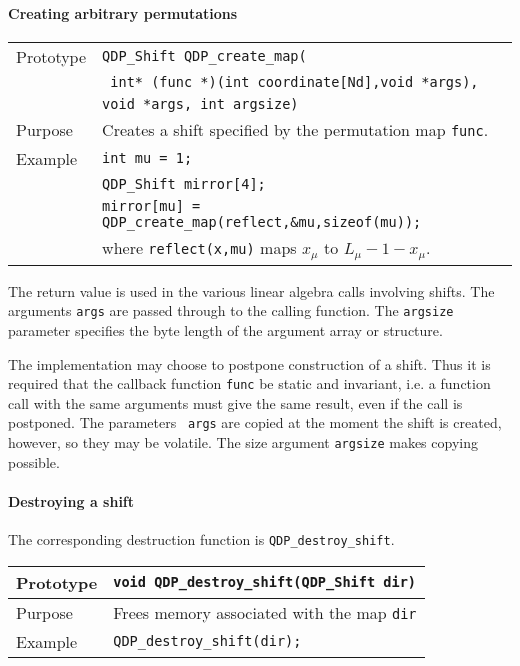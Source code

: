 \documentclass{article}
\begin{document}
\paragraph{Creating arbitrary permutations}

\begin{flushleft}
\begin{tabular}{|l|l|}
  \hline
  Prototype      & \verb|QDP_Shift QDP_create_map(|\\
                 & \verb| int* (func *)(int coordinate[Nd],void *args),|\\
                 & \verb|void *args, int argsize)| \\ 
\hline
Purpose        & Creates a shift specified by the permutation map {\tt func}. \\
    \hline
Example  & \verb|int mu = 1;|\\
         & \verb|QDP_Shift mirror[4];| \\
         & \verb|mirror[mu] = QDP_create_map(reflect,&mu,sizeof(mu));| \\
         & where {\tt reflect(x,mu)} maps $x_\mu$ to $L_\mu - 1 - x_\mu$. \\
\hline
  \end{tabular}
\end{flushleft}
%
The return value is used in the various linear
algebra calls involving shifts.  The arguments {\tt args} are passed
through to the calling function.  The {\tt argsize} parameter
specifies the byte length of the argument array or structure.

The implementation may choose to postpone construction of a shift.
Thus it is required that the callback function {\tt func} be static
and invariant, i.e. a function call with the same arguments must give
the same result, even if the call is postponed.  The parameters {\tt
args} are copied at the moment the shift is created, however, so they
may be volatile.  The size argument {\tt argsize} makes copying
possible.

\paragraph{Destroying a shift}

The corresponding destruction function is \verb|QDP_destroy_shift|. 

\begin{flushleft}
\begin{tabular}{|l|l|}
  \hline
  Prototype      & \verb|void QDP_destroy_shift(QDP_Shift dir)| \\ 
\hline
Purpose        & Frees memory associated with the map {\tt dir} \\
    \hline
Example  & \verb|QDP_destroy_shift(dir);| \\
\hline
  \end{tabular}
\end{flushleft}
\end{document}
